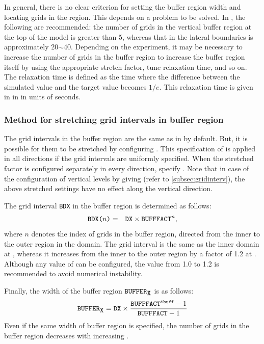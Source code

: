 In general, there is no clear criterion for setting the buffer region width and locating grids in the region.
This depends on a problem to be solved. In \scalerm, the following are recommended: the number of grids in the vertical buffer region at the top of the model is greater than 5, whereas that in the lateral boundaries is approximately 20$\sim$40. Depending on the experiment, it may be necessary to increase the number of grids in the buffer region to increase the buffer region itself by using the appropriate stretch factor, tune relaxation time, and so on.
The relaxation time is defined as the time
where the difference between the simulated value and the target value becomes $1/e$.
This relaxation time is given in 
in  in units of seconds.

\subsubsection{Method for stretching grid intervals in buffer region}

The grid intervals in the buffer region are the same as  in  by default.
But, it is possible for them to be stretched by configuring . This specification of  is applied in all directions if the grid intervals are uniformly specified. When the stretched factor is configured separately in every direction, specify . Note that in case of the configuration of vertical levels by giving  (refer to \ref{subsec:gridinterv}), the above stretched settings have no effect along the vertical direction.

The grid interval \verb|BDX| in the buffer region is determined as follows:
\begin{eqnarray}
 \verb|BDX(|n\verb|)| &=& \verb|DX| \times \verb|BUFFFACT|^n, \nonumber
\end{eqnarray}
where $n$ denotes the index of grids in the buffer region, directed from the inner to the outer region in the domain. The grid interval is the same as the inner domain at , whereas it increases from the inner to the outer region by a factor of 1.2 at .  Although any value of  can be configured, the value from 1.0 to 1.2 is recommended to avoid numerical instability.

Finally, the width of the buffer region $\verb|BUFFER|_{\verb|X|}$ is as follows:
\begin{eqnarray}
  \verb|BUFFER|_{\verb|X|} = \nmitemeq{DX} \times \frac{ \nmitemeq{BUFFFACT}^{\texttt{\detokenize{ibuff}}}-1}{ \nmitemeq{BUFFFACT}-1 }
\end{eqnarray}
Even if the same width of buffer region  is specified, the number of grids in the buffer region decreases with increasing .
